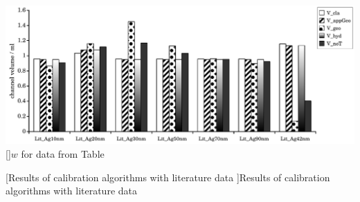 \begin{minipage}{\linewidth}
    \begin{minipage}{.75\linewidth}
      \includegraphics[width=\linewidth]{./images/data/eval_lit_p8/Lit2Data_V_8p.pdf}
        []{$w$ for data from Table}      
    \end{minipage}
  [Results of calibration algorithms with literature data
  ]{Results of calibration algorithms with literature data}
  \label{fig:LitDataResults_p8}
\end{minipage}
\clearpage
